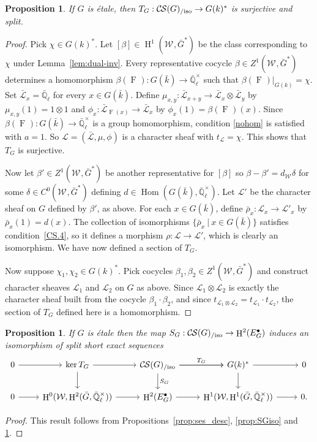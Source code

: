 \documentclass[10pt]{amsart}
\theoremstyle{plain}
\newtheorem{proposition}[theorem]{Proposition}
\theoremstyle{definition}
\theoremstyle{remark}
\newcommand{\EE}{\mathbb{\bar Q}_\ell}
\newcommand{\bFq}{\bar{k}}
\newcommand{\Fq}{k}
\newcommand{\EEx}{\EE^\times}
\newcommand{\Weil}[1]{\mathcal{W}_{#1}}
\newcommand{\Frob}[1]{\operatorname{F}_{#1}}
\DeclareMathOperator{\Hom}{Hom}
\DeclareMathOperator{\Hh}{H}
\newcommand{\tq}{{\ \vert\ }}
\newcommand{\trFrob}[1]{t_{#1}}
\newcommand{\TrFrob}[1]{T_{#1}}
\newcommand{\cs}[1]{{\mathcal{#1}}}
\newcommand{\gcs}[1]{{\mathcal{\bar #1}}}
\newcommand{\CS}{{\mathcal{C\hskip-0.8pt S}}}
\newcommand{\CSiso}[1]{\CS(#1)_{/\text{iso}}}
\newcommand{\bG}{\bar{G}}
\newcommand{\brho}{{\bar\rho}}
\begin{document}
\begin{proposition}\label{prop:sur_etale}
If $G$ is \'etale, then $\TrFrob{G} : \CSiso{G} \to G(\Fq)^*$ is surjective
and split.
\end{proposition}
\begin{proof}
Pick $\chi \in G(\Fq)^*$. 
Let $[\beta]\in \Hh^1(\Weil{},\bG^*)$ be the class corresponding to $\chi$ under Lemma~\ref{lem:dual-inv}.
Every representative cocycle $\beta \in Z^1(\Weil{},\bG^*)$ determines a homomorphism $\beta(\Frob{}) : G(\bFq)\to \EEx$ such that $\beta(\Frob{})\vert_{G(\Fq)} = \chi$.
Set $\gcs{L}_x = \EE$ for every $x\in G(\bFq)$.
Define $\mu_{x,y} : \gcs{L}_{x+y} \to \gcs{L}_x\otimes \gcs{L}_y$ by $\mu_{x,y}(1) = 1 \otimes 1$ and
$\phi_{x} : \gcs{L}_{\Frob{}(x)} \to \gcs{L}_x$ by $\phi_{x}(1) = \beta(\Frob{})(x)$.
Since $\beta(\Frob{}) : G(\bFq) \to \EEx$ is a group homomorphism,
condition \eqref{nohom} is satisfied with $a =1$.
So $\cs{L} = (\gcs{L}, \mu, \phi)$
is a character sheaf with $\trFrob{\cs{L}} = \chi$.
This shows that $\TrFrob{G}$ is surjective.

Now let $\beta' \in Z^1(\Weil{},\bG^*)$ be another representative for $[\beta]$
so $\beta-\beta' = d_{\Weil{}} \delta$ for some $\delta \in C^0(\Weil{},\bG^*)$ defining $d \in \Hom(G(\bFq),\EEx)$.
Let $\cs{L}'$ be the character sheaf on $G$ defined by $\beta'$, as above.
For each $x\in G(\bFq)$, define $\brho_x :\cs{L}_x\to \cs{L}'_x$ by $\brho_x(1) = d(x)$.
The collection of isomorphisms $\{ \brho_x \tq x\in G(\bFq)\}$ satisfies condition~\ref{CS.4}, so it defines a morphism $\rho : \cs{L}\to \cs{L}'$, which is clearly an isomorphism. 
%
We have now defined a section of $\TrFrob{G}$. 

Now suppose $\chi_1, \chi_2 \in G(\Fq)^*$. Pick cocycles $\beta_1,\beta_2\in Z^1(\Weil{},\bG^*)$ and construct character sheaves $\cs{L}_1$ and $\cs{L}_2$ on $G$ as above. Since $\cs{L}_1\otimes \cs{L}_2$ is exactly the character sheaf built from the cocycle $\beta_1\cdot \beta_2$, and since $\trFrob{\cs{L}_1\otimes \cs{L}_2} = \trFrob{\cs{L}_1}\cdot \trFrob{\cs{L}_2}$, the section of $\TrFrob{G}$ defined here is a homomorphism.
\end{proof}

\begin{proposition} \label{prop:etale-iso}
 If $G$ is \'etale then the map $S_G : \CSiso{G}\to \Hh^2(E^\bullet_G)$ induces an isomorphism of split short exact sequences
\[
\begin{tikzcd}
 0 \arrow{r} & \ker \TrFrob{G} \arrow{d} \arrow{r} & \CSiso{G}\arrow{d}{S_G} \arrow{r}{\TrFrob{G}} \arrow{r} & G(\Fq)^* \arrow{d} \arrow{r} & 0\\
  0 \arrow{r} & \Hh^0(\Weil{},\Hh^2(\bG,\EEx)) \arrow{r} & \Hh^2(E^\bullet_G) \arrow{r} & \Hh^1(\Weil{},\Hh^1(\bG,\EEx)) \arrow{r} & 0.
 \end{tikzcd}
 \]
\end{proposition}
\begin{proof}
This result follows from Propositions~\ref{prop:ses_desc}, \ref{prop:SGiso} and \ref{prop:sur_etale}.
\end{proof}
\end{document}
